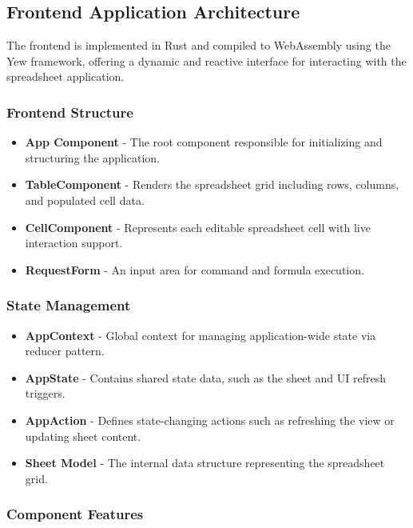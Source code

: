 \subsection{Frontend Application Architecture}

The frontend is implemented in Rust and compiled to WebAssembly using the Yew framework, offering a dynamic and reactive interface for interacting with the spreadsheet application.

\subsubsection{Frontend Structure}

\begin{itemize}
    \item \textbf{App Component} - The root component responsible for initializing and structuring the application.
    \item \textbf{TableComponent} - Renders the spreadsheet grid including rows, columns, and populated cell data.
    \item \textbf{CellComponent} - Represents each editable spreadsheet cell with live interaction support.
    \item \textbf{RequestForm} - An input area for command and formula execution.
\end{itemize}

\subsubsection{State Management}

\begin{itemize}
    \item \textbf{AppContext} - Global context for managing application-wide state via reducer pattern.
    \item \textbf{AppState} - Contains shared state data, such as the sheet and UI refresh triggers.
    \item \textbf{AppAction} - Defines state-changing actions such as refreshing the view or updating sheet content.
    \item \textbf{Sheet Model} - The internal data structure representing the spreadsheet grid.
\end{itemize}

\subsubsection{Component Features}

